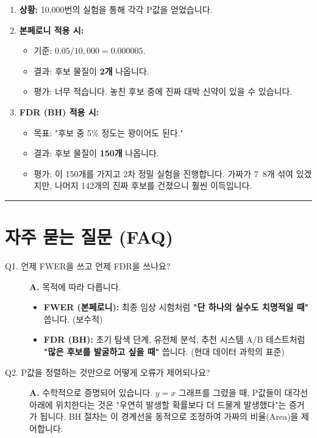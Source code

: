 \documentclass[11pt,a4paper]{book}
\theoremstyle{definition}
\begin{document}
\begin{enumerate}
    \item \textbf{상황:} 10,000번의 실험을 통해 각각 P값을 얻었습니다.
    \item \textbf{본페로니 적용 시:}
    \begin{itemize}
        \item 기준: $0.05 / 10,000 = 0.000005$.
        \item 결과: 후보 물질이 \textbf{2개} 나옵니다.
        \item 평가: 너무 적습니다. 놓친 후보 중에 진짜 대박 신약이 있을 수 있습니다.
    \end{itemize}
    \item \textbf{FDR (BH) 적용 시:}
    \begin{itemize}
        \item 목표: "후보 중 5\% 정도는 꽝이어도 된다."
        \item 결과: 후보 물질이 \textbf{150개} 나옵니다.
        \item 평가: 이 150개를 가지고 2차 정밀 실험을 진행합니다. 가짜가 7~8개 섞여 있겠지만, 나머지 142개의 진짜 후보를 건졌으니 훨씬 이득입니다.
    \end{itemize}
\end{enumerate}

\vspace{0.5cm}\hrule\vspace{0.5cm}

\section{자주 묻는 질문 (FAQ)}

\begin{description}
    \item[Q1. 언제 FWER을 쓰고 언제 FDR을 쓰나요?]
    \textbf{A.} 목적에 따라 다릅니다.
    \begin{itemize}
        \item \textbf{FWER (본페로니):} 최종 임상 시험처럼 \textbf{"단 하나의 실수도 치명적일 때"} 씁니다. (보수적)
        \item \textbf{FDR (BH):} 초기 탐색 단계, 유전체 분석, 추천 시스템 A/B 테스트처럼 \textbf{"많은 후보를 발굴하고 싶을 때"} 씁니다. (현대 데이터 과학의 표준)
    \end{itemize}
    
    \item[Q2. P값을 정렬하는 것만으로 어떻게 오류가 제어되나요?]
    \textbf{A.} 수학적으로 증명되어 있습니다. $y=x$ 그래프를 그렸을 때, P값들이 대각선 아래에 위치한다는 것은 "우연히 발생할 확률보다 더 드물게 발생했다"는 증거가 됩니다. BH 절차는 이 경계선을 동적으로 조정하여 가짜의 비율(Area)을 제어합니다.
\end{description}
\end{document}
